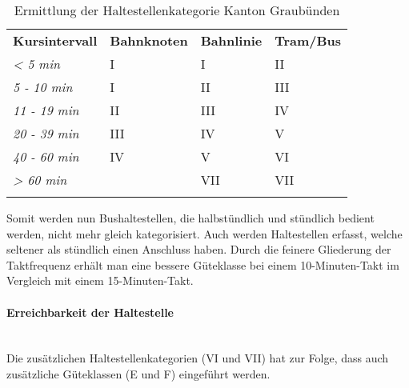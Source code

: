 \begin{longtable}[c]{l p{4.0cm} p{4.0cm} p{4.0cm}}
        \midrule
        \textbf{Kursintervall}
                                & \textbf{Bahnknoten}
                                & \textbf{Bahnlinie}
                                & \textbf{Tram/Bus}\\
        \textit{< 5 min}
                                & I
                                & I
                                & II\\
        \cellcolor{red!25}\textit{5 - 10 min}
                                & I
                                & II
                                & III\\
        \cellcolor{red!25}\textit{11 - 19 min}
                                & II
                                & III
                                & IV\\
        \textit{20 - 39 min}
                                & III
                                & IV
                                & V\\
        \textit{40 - 60 min}
                                & IV
                                & V
                                & \cellcolor{red!25}VI\\
        \cellcolor{red!25}\textit{> 60 min}
                                &
                                & \cellcolor{red!25}VII
                                & \cellcolor{red!25}VII\\
        \bottomrule
    \caption{Ermittlung der Haltestellenkategorie Kanton Graubünden}
    \label{table:Ermittlung der Haltestellenkategorie Kanton Graubünden}
\end{longtable}

Somit werden nun Bushaltestellen, die halbstündlich und stündlich bedient werden, nicht mehr gleich kategorisiert.
Auch werden Haltestellen erfasst, welche seltener als stündlich einen Anschluss haben.
Durch die feinere Gliederung der Taktfrequenz erhält man eine bessere Güteklasse bei einem 10-Minuten-Takt im Vergleich mit einem 15-Minuten-Takt.

\paragraph{Erreichbarkeit der Haltestelle}~\\
\label{Berechnungsmethodik Kanton Graubünden:Erreichbarkeit der Haltestelle}
Die zusätzlichen Haltestellenkategorien (VI und VII) hat zur Folge, dass auch zusätzliche Güteklassen (E und F) eingeführt werden.

